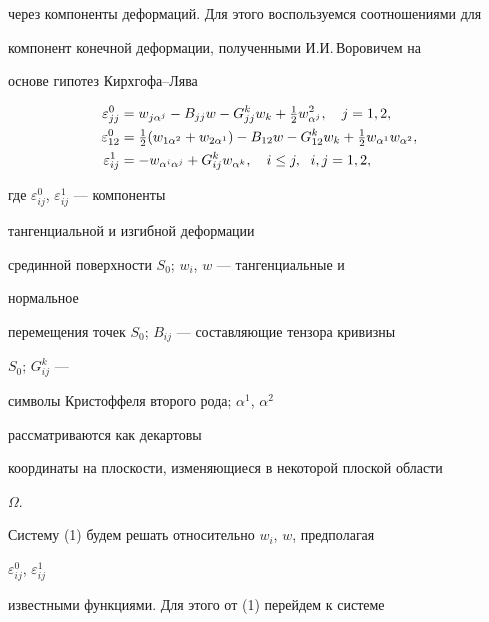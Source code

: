 через компоненты деформаций. Для этого воспользуемся соотношениями для 


компонент конечной деформации, полученными И.И.\,Воровичем \cite{1} на 


основе гипотез Кирхгофа--Лява 


\begin{align} 


\varepsilon^0_{jj}&=w_{j\alpha^j}-B_{jj}w-G^k_{jj}w_k 


+\tfrac{1}{2}w^2_{\alpha^j},\quad j=1,2,\notag \\ 


\varepsilon^0_{12}&=\tfrac{1}{2}(w_{1\alpha^2}+w_{2\alpha^1})- 


B_{12}w-G^k_{12}w_k+\tfrac{1}{2}w_{\alpha^1}w_{\alpha^2}, \\ 


\varepsilon^1_{ij}&=-w_{\alpha^i\alpha^j}+G^k_{ij}w_{\alpha^k}, 


\quad i\le j, \ \; i,j=1,2,\notag 


\end{align} 


где $\varepsilon^0_{ij}$, $\varepsilon^1_{ij}$ --- компоненты 


тангенциальной и изгибной деформации 


срединной поверхности $S_0$; $w_i$, $w$ --- тангенциальные и 


нормальное 


перемещения точек $S_0$; $B_{ij}$ --- составляющие тензора кривизны 


$S_0$; $G^k_{ij}$ --- 


символы Кристоффеля второго рода; $\alpha^1$, $\alpha^2$ 


рассматриваются как декартовы 


координаты на плоскости, изменяющиеся в некоторой плоской области 


$\Omega$. 


 


Систему (1) будем решать относительно $w_i$, $w$, предполагая 


$\varepsilon^0_{ij}$, $\varepsilon^1_{ij}$ 


известными функциями. Для этого от (1) перейдем к системе 


